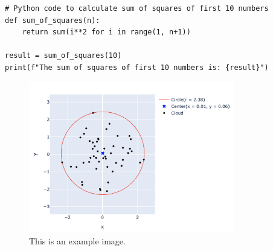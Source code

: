 \documentclass{article}  %
\begin{document}
\begin{lstlisting}
# Python code to calculate sum of squares of first 10 numbers
def sum_of_squares(n):
    return sum(i**2 for i in range(1, n+1))

result = sum_of_squares(10)
print(f"The sum of squares of first 10 numbers is: {result}")
\end{lstlisting}

\begin{figure}[h]
\centering
\includegraphics[width=0.8\textwidth]{graph.png}
\caption{This is an example image.\label{fig:example}}
\end{figure}

\end{document}

